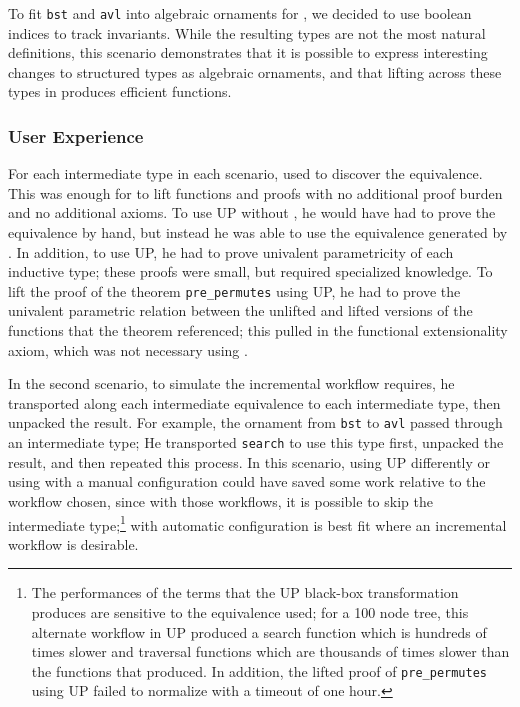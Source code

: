 To fit \lstinline{bst} and \lstinline{avl} into algebraic ornaments for \toolnamec,
we decided to use boolean indices to track invariants.
While the resulting types are not the most natural definitions,
this scenario demonstrates that it is possible to express interesting changes to structured types as algebraic ornaments,
and that lifting across these types in \toolnamec produces efficient functions.

\subsubsection{User Experience}
\label{sec:caseuser}

For each intermediate type in each scenario,  used \toolnamec to discover the equivalence.
This was enough for \toolnamec to lift functions and proofs 
with no additional proof burden and no additional axioms.
To use UP without \toolnamec, he would have had to prove the equivalence by hand,
but instead he was able to use the equivalence generated by \toolnamec.
In addition, to use UP, he had to prove univalent parametricity of each inductive type;
these proofs were small, but required specialized knowledge.
To lift the proof of the theorem \lstinline{pre_permutes} using UP, 
he had to prove the univalent parametric relation between the unlifted and lifted versions of the
functions that the theorem referenced; this pulled in the functional extensionality axiom, which was not necessary 
using \toolnamec.

In the second scenario, to simulate the incremental workflow \toolnamec requires, he transported along each intermediate equivalence to each intermediate type,
then unpacked the result.
For example, the ornament from \lstinline{bst} to \lstinline{avl} passed through an intermediate type;
He transported \lstinline{search} to use this type first, unpacked the result, and then repeated this process.
In this scenario, using UP differently or using \toolnamec with a manual configuration could have saved some work relative to the workflow chosen,
since with those workflows, it is possible to skip 
the intermediate type;\footnote{The performances of the terms that the UP black-box transformation produces are sensitive to the equivalence used;
for a 100 node tree, this alternate workflow in UP produced a search function
which is hundreds of times slower and traversal functions which are thousands of times slower
than the functions that \toolnamec produced. In addition, the lifted proof of \lstinline{pre_permutes} using UP failed to normalize
with a timeout of one hour.}
\toolnamec with automatic configuration is best fit where an incremental workflow is desirable.

